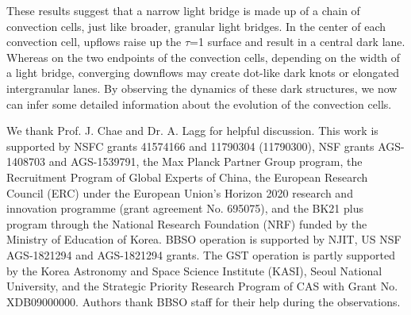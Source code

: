 \documentclass[preprint2]{aastex}
\begin{document}
These results suggest that a narrow light bridge is made up of a chain of convection cells, just like broader, granular light bridges. In the center of each convection cell, upflows raise up the $\tau$=1 surface and result in a central dark lane. Whereas on the two endpoints of the convection cells, depending on the width of a light bridge, converging downflows may create dot-like dark knots or elongated intergranular lanes. By observing the dynamics of these dark structures, we now can infer some detailed information about the evolution of the convection cells.

\begin{acknowledgements}
{We thank Prof. J. Chae and Dr. A. Lagg for helpful discussion. This work is supported by NSFC grants 41574166 and 11790304 (11790300), NSF grants AGS-1408703 and AGS-1539791, the Max Planck Partner Group program, the Recruitment Program of Global Experts of China, the European Research Council (ERC) under the European Union's Horizon 2020 research and innovation programme (grant agreement No. 695075), and the BK21 plus program through the National Research Foundation (NRF) funded by the Ministry of Education of Korea. BBSO operation is supported by NJIT, US NSF AGS-1821294 and AGS-1821294 grants. The GST operation is partly supported by the Korea Astronomy and Space Science Institute (KASI), Seoul National University, and the Strategic Priority Research Program of CAS with Grant No. XDB09000000. Authors thank BBSO staff for their help during the observations. }

\end{acknowledgements}
\end{document}
